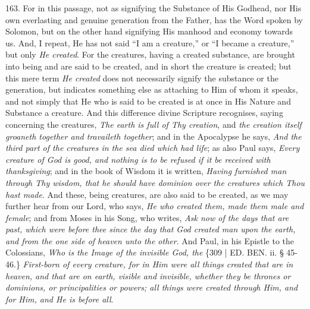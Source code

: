 163. For in this passage, not
as signifying the Substance of His Godhead, nor His own everlasting
and genuine generation from the Father, has the Word spoken by
Solomon, but on the other hand signifying His manhood and economy
towards us. And, I repeat, He has not said ``I am a creature,'' or ``I
became a creature,'' but only \emph{He created}. For the creatures,
having a created substance, are brought into being and are said to be
created, and in short the creature is created; but this mere term \emph{He
created} does not necessarily signify the substance or the
generation, but indicates something else as attaching to Him of whom
it speaks, and not simply that He who is said to be created is at once
in His Nature and Substance a creature. And this difference divine
Scripture recognises, saying concerning the creatures, \emph{The earth is
full of Thy creation}, and \emph{the creation itself groaneth together
and travaileth together}; and in the Apocalypse he says, \emph{And the
third part of the creatures in the sea died which had life}; as
also Paul says, \emph{Every creature of God is good, and nothing is to be
refused if it be received with thanksgiving}; and in the book of
Wisdom it is written, \emph{Having furnished man through Thy wisdom, that
he should have dominion over the creatures which Thou hast made}.
And these, being creatures, are also said to be created, as we may
further hear from our Lord, who says, \emph{He who created them, made
them male and female}; and from Moses in his Song, who writes, \emph{Ask
now of the days that are past, which were before thee since the day
that God created man upon the earth, and from the one side of heaven
unto the other}. And Paul, in his Epistle to the Colossians, \emph{Who
is the Image of the invisible God, the} \{309 | ED.
BEN.
ii. § 45-46.\} \emph{First-born of every creature, for in Him were all things
created that are in heaven, and that are on earth, visible and
invisible, whether they be thrones or dominions, or principalities or
powers; all things were created through Him, and for Him, and He is
before all}.


